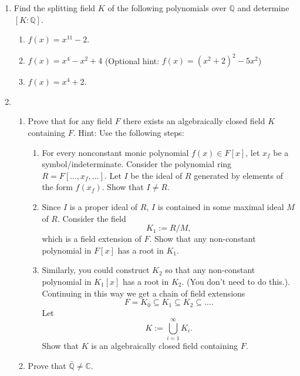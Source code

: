 \documentclass[notoc,notitlepage,nobib]{tufte-book}
\begin{document}
\begin{enumerate}
  \item Find the splitting field $K$ of the following polynomials over
    $\mathbb{Q}$ and determine $[ K : \mathbb{Q} ]$.
    \begin{enumerate}
      \item $f(x) = x^{11} - 2$.
      \item $f(x) = x^4 - x^2 + 4$ (Optional hint: $f(x) = (x^2 + 2)^2 - 5x^2$)
      \item $f(x) = x^4 + 2$.
    \end{enumerate}
  \item \begin{enumerate}
      \item Prove that for any field $F$ there exists an algebraically closed
        field $K$ containing $F$. Hint: Use the following steps:
        \begin{enumerate}
          \item For every nonconstant monic polynomial $f(x) \in F[x]$, let
            $x_f$ be a symbol/indeterminate. Consider the polynomial ring $R =
            F[\ldots, x_f, \ldots]$. Let $I$ be the ideal of $R$ generated by
            elements of the form $f(x_f)$. Show that $I \neq R$.
          \item Since $I$ is a proper ideal of $R$, $I$ is contained in some
            maximal ideal $M$ of $R$. Consider the field
            \begin{equation*}
              K_1 := R / M,
            \end{equation*}
            which is a field extension of $F$. Show that any non-constant
            polynomial in $F[x]$ has a root in $K_1$.
          \item Similarly, you could construct $K_2$ so that any non-constant
            polynomial in $K_1[x]$ has a root in $K_2$. (You don't need to do
            this.). Continuing in this way we get a chain of field extensions
            \begin{equation*}
              F = K_0 \subseteq K_1 \subseteq K_2 \subseteq \hdots.
            \end{equation*}
            Let
            \begin{equation*}
              K := \bigcup_{i=1}^{\infty} K_i.
            \end{equation*}
            Show that $K$ is an algebraically closed field containing $F$.
        \end{enumerate}
      \item Prove that $\bar{\mathbb{Q}} \neq \mathbb{C}$.

\end{enumerate}
\end{enumerate}
\end{document}
